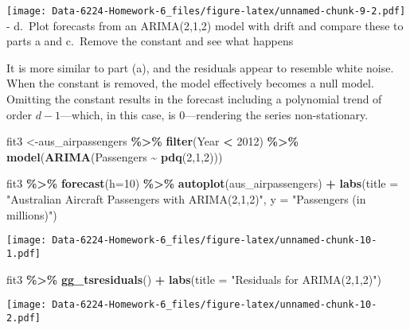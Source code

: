 \documentclass[
]{article}
\newenvironment{Shaded}{\begin{snugshade}}{\end{snugshade}}
\newcommand{\AttributeTok}[1]{\textcolor[rgb]{0.13,0.29,0.53}{#1}}
\newcommand{\DecValTok}[1]{\textcolor[rgb]{0.00,0.00,0.81}{#1}}
\newcommand{\FunctionTok}[1]{\textcolor[rgb]{0.13,0.29,0.53}{\textbf{#1}}}
\newcommand{\NormalTok}[1]{#1}
\newcommand{\OtherTok}[1]{\textcolor[rgb]{0.56,0.35,0.01}{#1}}
\newcommand{\SpecialCharTok}[1]{\textcolor[rgb]{0.81,0.36,0.00}{\textbf{#1}}}
\newcommand{\StringTok}[1]{\textcolor[rgb]{0.31,0.60,0.02}{#1}}
\begin{document}
\texttt{[image: Data-6224-Homework-6\_files/figure-latex/unnamed-chunk-9-2.pdf]}
- d.~Plot forecasts from an ARIMA(2,1,2) model with drift and compare
these to parts a and c.~Remove the constant and see what happens

It is more similar to part (a), and the residuals appear to resemble
white noise. When the constant is removed, the model effectively becomes
a null model. Omitting the constant results in the forecast including a
polynomial trend of order \(d - 1\)---which, in this case, is
0---rendering the series non-stationary.

\begin{Shaded}
\begin{Highlighting}[]
\NormalTok{fit3 }\OtherTok{\textless{}{-}}\NormalTok{aus\_airpassengers }\SpecialCharTok{\%\textgreater{}\%}
  \FunctionTok{filter}\NormalTok{(Year }\SpecialCharTok{\textless{}} \DecValTok{2012}\NormalTok{) }\SpecialCharTok{\%\textgreater{}\%}
  \FunctionTok{model}\NormalTok{(}\FunctionTok{ARIMA}\NormalTok{(Passengers }\SpecialCharTok{\textasciitilde{}} \FunctionTok{pdq}\NormalTok{(}\DecValTok{2}\NormalTok{,}\DecValTok{1}\NormalTok{,}\DecValTok{2}\NormalTok{)))}

\NormalTok{fit3 }\SpecialCharTok{\%\textgreater{}\%} 
  \FunctionTok{forecast}\NormalTok{(}\AttributeTok{h=}\DecValTok{10}\NormalTok{) }\SpecialCharTok{\%\textgreater{}\%}
  \FunctionTok{autoplot}\NormalTok{(aus\_airpassengers) }\SpecialCharTok{+}
  \FunctionTok{labs}\NormalTok{(}\AttributeTok{title =} \StringTok{"Australian Aircraft Passengers with ARIMA(2,1,2)"}\NormalTok{, }\AttributeTok{y =} \StringTok{"Passengers (in millions)"}\NormalTok{)}
\end{Highlighting}
\end{Shaded}

\texttt{[image: Data-6224-Homework-6\_files/figure-latex/unnamed-chunk-10-1.pdf]}

\begin{Shaded}
\begin{Highlighting}[]
\NormalTok{fit3 }\SpecialCharTok{\%\textgreater{}\%} 
  \FunctionTok{gg\_tsresiduals}\NormalTok{() }\SpecialCharTok{+}
  \FunctionTok{labs}\NormalTok{(}\AttributeTok{title =} \StringTok{"Residuals for ARIMA(2,1,2)"}\NormalTok{)}
\end{Highlighting}
\end{Shaded}

\texttt{[image: Data-6224-Homework-6\_files/figure-latex/unnamed-chunk-10-2.pdf]}
\end{document}
